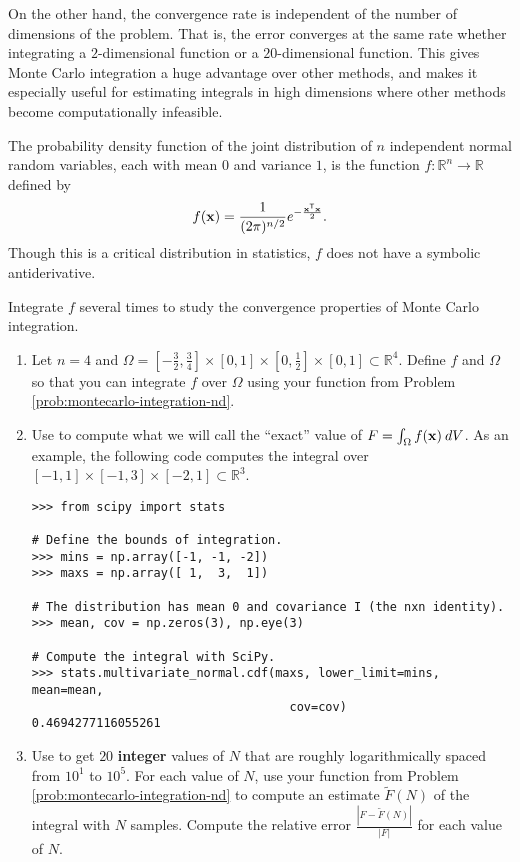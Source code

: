 On the other hand, the convergence rate is independent of the number of dimensions of the problem.
That is, the error converges at the same rate whether integrating a $2$-dimensional function or a $20$-dimensional function.
This gives Monte Carlo integration a huge advantage over other methods, and makes it especially useful for estimating integrals in high dimensions where other methods become computationally infeasible.

\begin{problem}
The probability density function of the joint distribution of $n$ independent normal random variables, each with mean $0$ and variance $1$, is the function $f:\mathbb{R}^n\rightarrow\mathbb{R}$ defined by
\begin{equation*}
    f(\mathbf{x}) = \frac{1}{(2 \pi)^{n/2}} e^{- \frac{\mathbf{x}^{\mathsf T}\mathbf{x}}{2}}.
\end{equation*}
Though this is a critical distribution in statistics, $f$ does not have a symbolic antiderivative.

Integrate $f$ several times to study the convergence properties of Monte Carlo integration.

\begin{enumerate}
\item Let $n=4$ and $\Omega=[-\frac{3}{2}, \frac{3}{4}]\times[0,1]\times[0, \frac{1}{2}]\times[0,1] \subset \mathbb{R}^4$.
Define $f$ and $\Omega$ so that you can integrate $f$ over $\Omega$ using your function from Problem \ref{prob:montecarlo-integration-nd}.

\item Use  to compute what we will call the ``exact'' value of $F = \int_\Omega f(\mathbf{x})\:dV$.
As an example, the following code computes the integral over $[-1,1]\times [-1,3]\times[-2,1] \subset \mathbb{R}^3$.
\begin{lstlisting}
>>> from scipy import stats

# Define the bounds of integration.
>>> mins = np.array([-1, -1, -2])
>>> maxs = np.array([ 1,  3,  1])

# The distribution has mean 0 and covariance I (the nxn identity).
>>> mean, cov = np.zeros(3), np.eye(3)

# Compute the integral with SciPy.
>>> stats.multivariate_normal.cdf(maxs, lower_limit=mins, mean=mean, 
                                    cov=cov)
0.4694277116055261
\end{lstlisting}

\item Use  to get $20$ \textbf{integer} values of $N$ that are roughly logarithmically spaced from $10^1$ to $10^5$.
For each value of $N$, use your function from Problem \ref{prob:montecarlo-integration-nd} to compute an estimate $\tilde{F}(N)$ of the integral with $N$ samples.
Compute the relative error $\frac{|F - \tilde{F}(N)|}{|F|}$ for each value of $N$.


\end{enumerate}
\end{problem}
